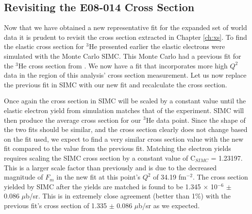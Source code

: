 
\subsection{Revisiting the E08-014 Cross Section}
\label{ssec:xs_revisit}

Now that we have obtained a new representative fit for the expanded set of world data it is prudent to revisit the cross section extracted in Chapter \ref{ch:xs}. To find the elastic cross section for $^3$He presented earlier the elastic electrons were simulated with the Monte Carlo SIMC. This Monte Carlo had a previous fit for the $^3$He cross section from \cite{Article:Amroun}. We now have a fit that incorporates more high $Q^2$ data in the region of this analysis' cross section measurement. Let us now replace the previous fit in SIMC with our new fit and recalculate the cross section.

Once again the cross section in SIMC will be scaled by a constant value until the elastic electron yield from simulation matches that of the experiment. SIMC will then produce the average cross section for our $^3$He data point. Since the shape of the two fits should be similar, and the cross section clearly does not change based on the fit used, we expect to find a very similar cross section value with the new fit compared to the value from the previous fit. Matching the electron yields requires scaling the SIMC cross section by a constant value of C$_{SIMC}$ = 1.23197. This is a larger scale factor than previously and is due to the decreased magnitude of $F_m$ in the new fit at this point's $Q^2$ of 34.19 fm$^{-2}$. The cross section yielded by SIMC after the yields are matched is found to be 1.345 $\times$ 10$^{-6}$ $\pm$ 0.086 $\mu$b/sr. This is in extremely close agreement (better than 1$\%$) with the previous fit's cross section of 1.335 $\pm$ 0.086 $\mu$b/sr as we expected.

